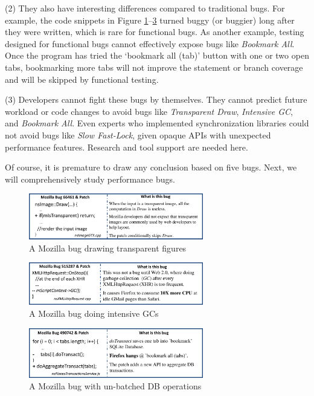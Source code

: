 (2) They also have interesting differences compared to traditional bugs.
For example, the code snippets in Figure 
\ref{fig:moz66461}--\ref{fig:uncoord2}
turned buggy (or buggier) long after they were written,
which is rare for functional bugs.
As another example, testing designed for functional bugs
cannot effectively expose bugs like {\it Bookmark All}. 
Once the program has tried the `bookmark all (tab)' button with one or two open tabs,
bookmarking more tabs will not improve the statement or branch coverage and
will be skipped by functional testing.

(3) Developers cannot fight these bugs by themselves.
They cannot predict future workload
or code changes to avoid bugs like {\it Transparent Draw}, 
{\it Intensive GC}, and
{\it Bookmark All}. Even experts
who implemented synchronization libraries
could not avoid bugs like {\it Slow Fast-Lock}, 
given opaque APIs with unexpected performance features.
Research and tool support are needed here.

Of course, it is premature to draw any conclusion based on five bugs.
Next, we will comprehensively study \allbugs performance bugs.


\begin{figure}[t!]
\begin{center}
\includegraphics[width=3in]{figures/moz664614}
\caption{A Mozilla bug drawing transparent figures}
\label{fig:moz66461}
\end{center}
\end{figure}

\begin{figure}[t!]
\begin{center}
\includegraphics[width=3in]{figures/moz515287}
\caption{ {A Mozilla bug doing intensive GCs}}
\label{fig:moz515287}
\end{center}
\end{figure}

\begin{figure}[t]
\begin{center}
\includegraphics[width=3in]{figures/moz490742}
\caption{A Mozilla bug with un-batched DB operations}
\label{fig:uncoord2}
\end{center}
\end{figure}

